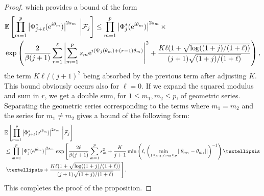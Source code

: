 \documentclass[10pt,a4paper]{amsart}
\begin{document}
\begin{proof}
which provides a bound of the form 
\begin{align*}
 &\mathbb{E} \left[ \prod_{m=1}^p \left|\Phi^*_{j+\ell} (\mathrm{e}^{\textnormal{i} \theta_m})
\right|^{2s_m} \;  \bigg| \mathcal{F}_j \right]  \leq \prod_{m=1}^p \left|\Phi^*_{j} (\mathrm{e}^{\textnormal{i} \theta_m})
\right|^{2s_m} \times  \\ &\exp \left( 
\frac{2}{\beta (j+1)} \sum_{r = 1}^{\ell}
\left|\sum_{m=1}^{p} s_m \mathrm{e}^{\textnormal{i} (\Psi_{j} (\theta_m) + (r-1) \theta_m) }\right|^2 
+ \frac{K \ell  (1 + \sqrt{\log((1+j)/(1+\ell))} }{(j+1)\sqrt{(1+j)/(1+\ell)}}
\right),
\end{align*}
the term $K\ell/(j+1)^2$ being absorbed by the previous term after adjusting $K$. 
This bound obviously occurs also for $\ell = 0$. 
If we expand the squared modulus and sum in $r$, we get a double sum, for $1 \leq m_1, m_2 \leq p$, of geometric series. 
Separating the geometric series corresponding to the terms where $m_1 = m_2$ and the series for $m_1 \neq m_2$ gives a bound of the following form:  
\begin{align*}
& \mathbb{E} \left[ \prod_{m=1}^p \left|\Phi^*_{j+\ell} (\mathrm{e}^{\textnormal{i} \theta_m})
\right|^{2s_m} \;  \bigg| \mathcal{F}_j \right]
\\ & \leq \prod_{m=1}^p \left|\Phi^*_{j} (\mathrm{e}^{\textnormal{i} \theta_m})
\right|^{2s_m} \, \exp \left[ 
\frac{2 \ell}{\beta (j+1)}  
 \sum_{m=1}^{p} s_m^2 
+ \frac{K}{j+1} \min \left( \ell, \left(\min_{1 \leq m_1 \neq m_2 \leq p} 
||\theta_{m_1} - \theta_{m_2}|| \right)^{-1} \right)  \dots \right.
\\ & \left.  \dots
+ \frac{K \ell  (1 + \sqrt{\log((1+j)/(1+\ell))} }{(j+1)\sqrt{(1+j)/(1+\ell)}}
\right].
\end{align*}
This completes the proof of the proposition. 
\end{proof}
\end{document}
